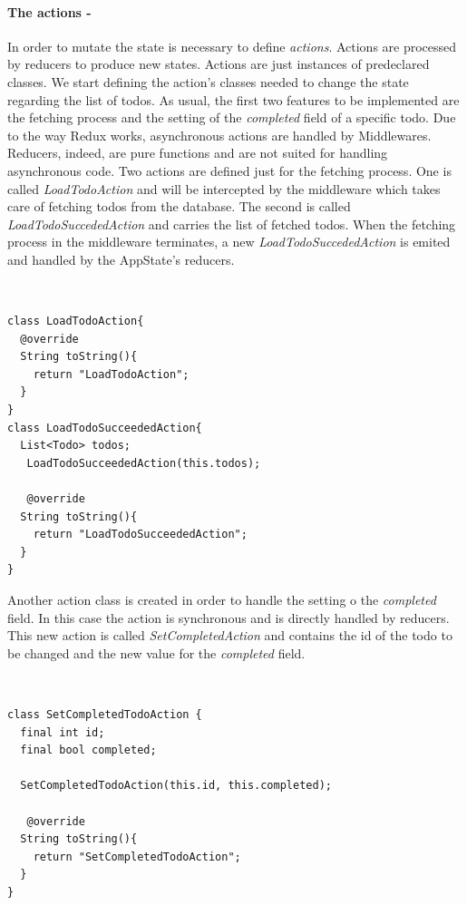 \paragraph{The actions - }
\label{subpar:todo_app_bloc_core_state}In order to mutate the state is necessary to define \textit{actions}. Actions are processed by reducers to produce new states. Actions are just instances of predeclared classes. We start defining the action's classes needed to change the state regarding the list of todos. As usual, the first two features to be implemented are the fetching process and the setting of the \textit{completed} field of a specific todo. Due to the way Redux works, asynchronous actions are handled by Middlewares. Reducers, indeed, are pure functions and are not suited for handling asynchronous code. Two actions are defined just for the fetching process. One is called \textit{LoadTodoAction} and will be intercepted by the middleware which takes care of fetching todos from the database. The second is called \textit{LoadTodoSuccededAction} and carries the list of fetched todos. When the fetching process in the middleware terminates, a new \textit{LoadTodoSuccededAction} is emited and handled by the AppState's reducers.
\begin{code}
\mbox{}\\
 \mbox{}
		\label{code:2.14}
\begin{verbatim}
class LoadTodoAction{
  @override
  String toString(){
    return "LoadTodoAction";
  }
}
class LoadTodoSucceededAction{
  List<Todo> todos;
   LoadTodoSucceededAction(this.todos);
   
   @override
  String toString(){
    return "LoadTodoSucceededAction";
  }
}
\end{verbatim}
\mbox{}
\end{code}

Another action class is created in order to handle the setting o the \textit{completed} field. In this case the action is synchronous and is directly handled by reducers. This new action is called \textit{SetCompletedAction} and contains the id of the todo to be changed and the new value for the \textit{completed} field.
\begin{code}
\mbox{}\\
 \mbox{}
		\label{code:2.14}
\begin{verbatim}
class SetCompletedTodoAction {
  final int id;
  final bool completed;

  SetCompletedTodoAction(this.id, this.completed);
  
   @override
  String toString(){
    return "SetCompletedTodoAction";
  }
}
\end{verbatim}
\mbox{}
\end{code}

